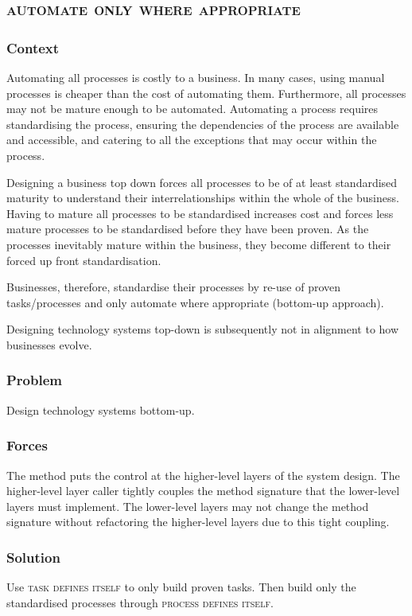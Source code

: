 \documentclass[prodmode]{style/acmlarge}
\begin{document}
\subsection{\textsc{\textbf{automate only where appropriate}}}

\subsubsection*{Context} Automating all processes is costly to a business.  In
many cases, using manual processes is cheaper than the cost of automating them.
Furthermore, all processes may not be mature enough to be automated.  Automating
a process requires standardising the process, ensuring the dependencies of the
process are available and accessible, and catering to all the exceptions that
may occur within the process.

Designing a business top down forces all processes to be of at least
standardised maturity to understand their interrelationships within the whole of
the business.  Having to mature all processes to be standardised increases cost
and forces less mature processes to be standardised before they have been
proven.  As the processes inevitably mature within the business, they become
different to their forced up front standardisation.

Businesses, therefore, standardise their processes by re-use of proven
tasks/processes and only automate where appropriate (bottom-up approach).

Designing technology systems top-down is subsequently not in alignment to how
businesses evolve.

\subsubsection*{Problem} Design technology systems bottom-up.

\subsubsection*{Forces} The method puts the control at the higher-level layers
of the system design.  The higher-level layer caller tightly couples the method
signature that the lower-level layers must implement.  The lower-level layers
may not change the method signature without refactoring the higher-level layers
due to this tight coupling.

\subsubsection*{Solution} Use \textsc{task defines itself} to only build proven
tasks.  Then build only the standardised processes through \textsc{process
defines itself}.
\end{document}
